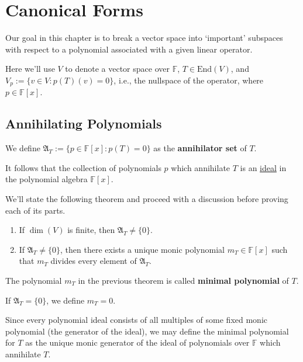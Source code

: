 \chapter{Canonical Forms}

Our goal in this chapter is to break a vector space into `important' subspaces with respect to a polynomial associated with a given linear operator.

Here we'll use $V$ to denote a vector space over $\mathbb{F}$, $T \in \text{End}(V)$, and $V_p := \{ v \in V : p(T)(v) = 0 \}$, i.e., the nullspace of the operator, where $p \in \mathbb{F}[x]$.

\section{Annihilating Polynomials}

\begin{definition}
	We define $\mathfrak{A}_T := \{ p \in \mathbb{F}[x] : p(T) = 0 \}$ as the \textbf{annihilator set} of $T$.
\end{definition}

It follows that the collection of polynomials $p$ which annihilate $T$ is an \hyperref[def:ideal]{ideal} in the polynomial algebra $\mathbb{F}[x]$.

We'll state the following theorem and proceed with a discussion before proving each of its parts.

\begin{theorem}\label{thm:minimal-polynomial} \hfill
	\begin{enumerate}
		\item If $\dim (V)$ is finite, then $\mathfrak{A}_T \neq \{ 0 \}$.
		\item If $\mathfrak{A}_T \neq \{ 0 \}$, then there exists a unique monic polynomial $m_T \in \mathbb{F}[x]$ such that $m_T$ divides every element of $\mathfrak{A}_T$.
	\end{enumerate}
\end{theorem}

\begin{definition}
	The polynomial $m_T$ in the previous theorem is called \textbf{minimal polynomial} of $T$.
	
	If $\mathfrak{A}_T = \{ 0 \}$, we define $m_T = 0$.
\end{definition}

Since every polynomial ideal consists of all multiples of some fixed monic polynomial (the generator of the ideal), we may define the minimal polynomial for $T$ as the unique monic generator of the ideal of polynomials over $\mathbb{F}$ which annihilate $T$.

